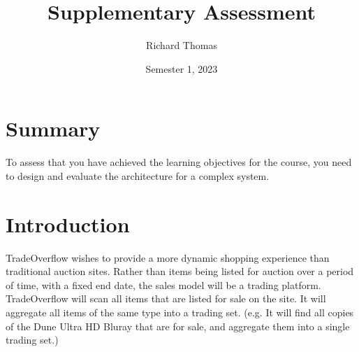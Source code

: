 \documentclass{csse4400}
\title{Supplementary Assessment}
\author{Richard Thomas}
\date{Semester 1, 2023}
\begin{document}

\maketitle

\section*{Summary}
To assess that you have achieved the learning objectives for the course,
you need to design and evaluate the architecture for a complex system.


\section{Introduction}
TradeOverflow wishes to provide a more dynamic shopping experience than traditional auction sites.
Rather than items being listed for auction over a period of time, with a fixed end date,
the sales model will be a trading platform.
TradeOverflow will scan all items that are listed for sale on the site.
It will aggregate all items of the same type into a trading set.
(e.g. It will find all copies of the Dune Ultra HD Bluray that are for sale, and aggregate them into a single trading set.)
\end{document}
